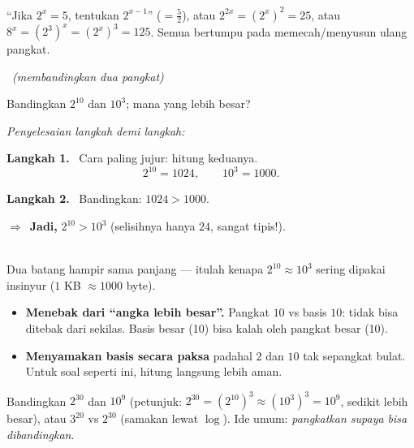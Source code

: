 \documentclass[11pt,a4paper]{report}
\theoremstyle{gaya}
\newcommand{\jawab}{\par\smallskip\noindent\textit{\textcolor{oranye}{Penyelesaian langkah demi langkah:}}\par\smallskip}
\newcommand{\langkah}[1]{\par\smallskip\noindent\textbf{\textcolor{biru}{Langkah #1.}}\ }
\newcommand{\jadi}{\par\smallskip\noindent$\Rightarrow$\ \textbf{Jadi, }}
\newcommand{\soalno}[2]{%
  \par\bigskip
  \noindent{\large\bfseries\color{ungu}\rule[-2pt]{4pt}{14pt}\ Soal #1}%
  \ {\normalfont\itshape\color{gray}(#2)}\par\nopagebreak\smallskip}
\begin{document}
\begin{variasi}
``Jika $2^x=5$, tentukan $2^{x-1}$'' ($=\frac52$), atau $2^{2x}=(2^x)^2=25$, atau
$8^x=(2^3)^x=(2^x)^3=125$. Semua bertumpu pada memecah/menyusun ulang pangkat.
\end{variasi}

\soalno{1.1.6}{membandingkan dua pangkat}
\begin{soalbox}{}
Bandingkan $2^{10}$ dan $10^3$; mana yang lebih besar?
\end{soalbox}

\jawab
\langkah{1} Cara paling jujur: hitung keduanya.
\[
2^{10} = 1024, \qquad 10^3 = 1000.
\]
\langkah{2} Bandingkan: $1024 > 1000$.
\jadi $2^{10} > 10^3$ (selisihnya hanya $24$, sangat tipis!).

\begin{center}
\\
{\small Dua batang hampir sama panjang --- itulah kenapa $2^{10}\approx 10^3$
sering dipakai insinyur ($1$ KB $\approx 1000$ byte).}
\end{center}

\begin{jebakan}
\begin{itemize}[leftmargin=*,topsep=2pt]
  \item \textbf{Menebak dari ``angka lebih besar''.} Pangkat $10$ vs basis $10$:
  tidak bisa ditebak dari sekilas. Basis besar (10) bisa kalah oleh pangkat besar
  (10).
  \item \textbf{Menyamakan basis secara paksa} padahal $2$ dan $10$ tak sepangkat
  bulat. Untuk soal seperti ini, hitung langsung lebih aman.
\end{itemize}
\end{jebakan}

\begin{variasi}
Bandingkan $2^{30}$ dan $10^9$ (petunjuk: $2^{30}=(2^{10})^3\approx(10^3)^3=10^9$,
sedikit lebih besar), atau $3^{20}$ vs $2^{30}$ (samakan lewat $\log$). Ide
umum: \emph{pangkatkan supaya bisa dibandingkan}.
\end{variasi}
\end{document}
